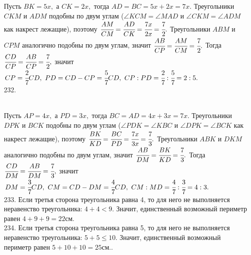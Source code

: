 \documentclass[12pt]{article}
\begin{document}
Пусть $BK=5x,$ а $CK=2x,$ тогда $AD=BC=5x+2x=7x.$ Треугольники $CKM$ и $ADM$ подобны по двум углам ($\angle KCM=\angle MAD$ и $\angle CKM=\angle ADM$ как накрест лежащие), поэтому $\cfrac{AM}{CM}=\cfrac{AD}{CK}=\cfrac{7x}{2x}=\cfrac{7}{2}.$ Треугольники $ABM$ и $CPM$ аналогично подобны по двум углам, значит $\cfrac{AB}{CP}=\cfrac{AM}{CM}=\cfrac{7}{2}.$ Тогда $\cfrac{CD}{CP}=\cfrac{AB}{CP}=\cfrac{7}{2},$ значит $CP=\cfrac{2}{7}CD,\ PD=CD-CP=\cfrac{5}{7}CD,\ CP:PD=\cfrac{2}{7}:\cfrac{5}{7}=2:5.$\\
232. \begin{figure}[ht!]
\end{figure}\\
Пусть $AP=4x,$ а $PD=3x,$ тогда $BC=AD=4x+3x=7x.$ Треугольники $DPK$ и $BCK$ подобны по двум углам ($\angle PDK=\angle KBC$ и $\angle DPK=\angle BCK$ как накрест лежащие), поэтому $\cfrac{BK}{KD}=\cfrac{BC}{PD}=\cfrac{7x}{3x}=\cfrac{7}{3}.$ Треугольники $ABK$ и $DKM$ аналогично подобны по двум углам, значит $\cfrac{AB}{DM}=\cfrac{BK}{KD}=\cfrac{7}{3}.$ Тогда $\cfrac{CD}{DM}=\cfrac{AB}{DM}=\cfrac{7}{3},$ значит $DM=\cfrac{3}{7}CD,\ CM=CD-DM=\cfrac{4}{7}CD,\ CM:MD=\cfrac{4}{7}:\cfrac{3}{7}=4:3.$\\
233. Если третья сторона треугольника равна 4, то для него не выполняется неравенство треугольника: $4+4<9.$ Значит, единственный возможный периметр равен $4+9+9=22$см.\\
234. Если третья сторона треугольника равна 5, то для него не выполняется неравенство треугольника: $5+5\leqslant10.$ Значит, единственный возможный периметр равен $5+10+10=25$см.\newpage{}. \begin{figure}[ht!]
\end{figure}\\
\end{document}
